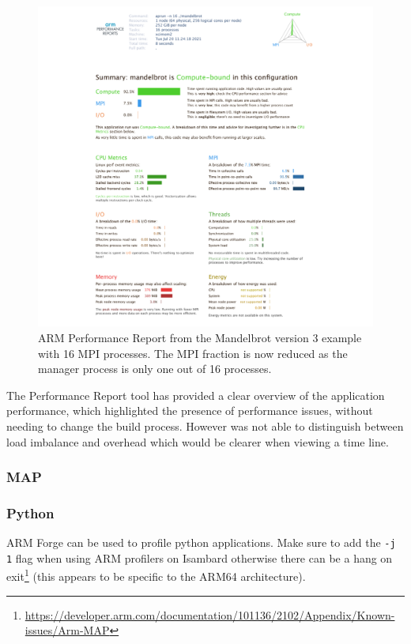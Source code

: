 \documentclass[a4paper,titlepage]{article}
\begin{document}
\begin{figure}[htbp]
\begin{center}
\includegraphics[scale=0.35]{figures/mandelbrot_v3_16procs_PerformanceReport}
\caption{ARM Performance Report from the Mandelbrot version 3 example with 16 MPI processes. The MPI fraction is now reduced as the manager process is only one out of 16 processes.}
\label{fig:perf-report_MB3_16procs}
\end{center}
\end{figure}

The Performance Report tool has provided a clear overview of the application performance, which highlighted the presence of performance issues, without needing to change the build process. However was not able to distinguish between load imbalance and overhead which would be clearer when viewing a time line.


\subsubsection{MAP}

\subsubsection{Python}

ARM Forge can be used to profile python applications. 
Make sure to add the \verb+-j 1+ flag when using ARM profilers on Isambard otherwise there can be a hang on exit\footnote{\url{https://developer.arm.com/documentation/101136/2102/Appendix/Known-issues/Arm-MAP}} (this appears to be specific to the ARM64 architecture).
\end{document}
